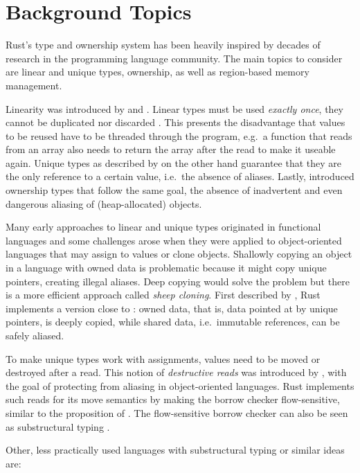 \section{Background Topics}

Rust's type and ownership system has been heavily inspired by decades of
research in the programming language community. The main topics to consider are
linear and unique types, ownership, as well as region-based memory management.

Linearity was introduced by \citet{girard} and \citet{Wadler90lineartypes}.
Linear types must be used \emph{exactly once}, they cannot be duplicated nor
discarded \cite{use-once}. This presents the disadvantage that values to be
reused have to be threaded through the program, e.g.~a function that reads from
an array also needs to return the array after the read to make it useable again.
Unique types as described by \citet{alias-free-pointers} on the other hand
guarantee that they are the only reference to a certain value, i.e.~the absence
of aliases. Lastly, \citet{ownership-types} introduced ownership types that
follow the same goal, the absence of inadvertent and even dangerous aliasing of
(heap-allocated) objects.

Many early approaches to linear and unique types originated in functional
languages and some challenges arose when they were applied to object-oriented
languages that may assign to values or clone objects. Shallowly copying an
object in a language with owned data is problematic because it might copy unique
pointers, creating illegal aliases. Deep copying would solve the problem but
there is a more efficient approach called \emph{sheep cloning}. First described
by \citet{dynamic-alias-protection}, Rust implements a version close to
\cite{sheep-cloning}: owned data, that is, data pointed at by unique pointers,
is deeply copied, while shared data, i.e.~immutable references, can be safely
aliased.

To make unique types work with assignments, values need to be moved or destroyed
after a read. This notion of \emph{destructive reads} was introduced by
\citet{islands-alias-protection}, with the goal of protecting from aliasing in
object-oriented languages. Rust implements such reads for its move semantics by
making the borrow checker flow-sensitive, similar to the proposition of
\citet{alias-burying}. The flow-sensitive borrow checker can also be seen as
substructural typing \cite{oxide}.

Other, less practically used languages with substructural typing or
similar ideas are:

